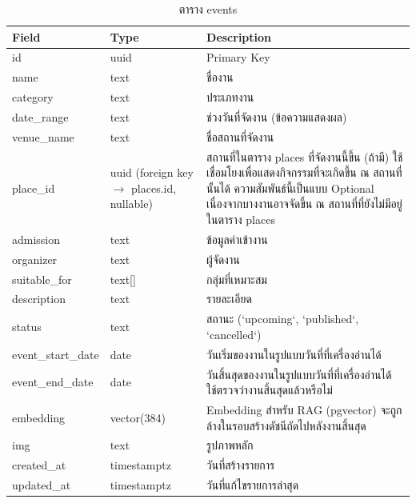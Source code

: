\begin{table}[H]
\centering
\caption{ตาราง events}
\label{tab:db_event}
\begin{tabular}{|p{3.6cm}|p{2.6cm}|p{6.8cm}|}
\hline
\textbf{Field} & \textbf{Type} & \textbf{Description} \\
\hline
id & uuid & Primary Key \\ \hline
name & text & ชื่องาน \\ \hline
category & text & ประเภทงาน \\ \hline
date\_range & text & ช่วงวันที่จัดงาน (ข้อความแสดงผล) \\ \hline
venue\_name & text & ชื่อสถานที่จัดงาน \\ \hline
place\_id & uuid (foreign key $\to$ places.id, nullable) & สถานที่ในตาราง places ที่จัดงานนี้ขึ้น (ถ้ามี) ใช้เชื่อมโยงเพื่อแสดงกิจกรรมที่จะเกิดขึ้น ณ สถานที่นั้นได้ ความสัมพันธ์นี้เป็นแบบ Optional เนื่องจากบางงานอาจจัดขึ้น ณ สถานที่ที่ยังไม่มีอยู่ในตาราง places \\ \hline
admission & text & ข้อมูลค่าเข้างาน \\ \hline
organizer & text & ผู้จัดงาน \\ \hline
suitable\_for & text[] & กลุ่มที่เหมาะสม \\ \hline
description & text & รายละเอียด \\ \hline
status & text & สถานะ (`upcoming`, `published`, `cancelled`) \\ \hline
event\_start\_date & date & วันเริ่มของงานในรูปแบบวันที่ที่เครื่องอ่านได้ \\ \hline
event\_end\_date & date & วันสิ้นสุดของงานในรูปแบบวันที่ที่เครื่องอ่านได้ ใช้ตรวจว่างานสิ้นสุดแล้วหรือไม่ \\ \hline
embedding & vector(384) & Embedding สำหรับ RAG (pgvector) จะถูกล้างในรอบสร้างดัชนีถัดไปหลังงานสิ้นสุด \\ \hline
img & text & รูปภาพหลัก \\ \hline
created\_at & timestamptz & วันที่สร้างรายการ \\ \hline
updated\_at & timestamptz & วันที่แก้ไขรายการล่าสุด \\
\hline
\end{tabular}
\end{table}

